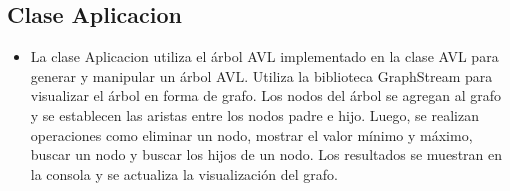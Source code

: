 \documentclass{article}
\begin{document}
\subsection{Clase Aplicacion}
\begin{itemize}	
	\item La clase Aplicacion utiliza el árbol AVL implementado en la clase AVL para generar y manipular un árbol AVL. Utiliza la biblioteca GraphStream para visualizar el árbol en forma de grafo. Los nodos del árbol se agregan al grafo y se establecen las aristas entre los nodos padre e hijo. Luego, se realizan operaciones como eliminar un nodo, mostrar el valor mínimo y máximo, buscar un nodo y buscar los hijos de un nodo. Los resultados se muestran en la consola y se actualiza la visualización del grafo.
\end{itemize}	
	
\end{document}

